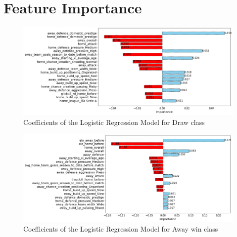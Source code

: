 \chapter{Feature Importance}
\label{appendix:feature_importance}

\begin{figure}[H]
    \centering
    \includegraphics[width=\textwidth, keepaspectratio]{images/top20_coeff_importance_lr_selected_features_draw.png}
    \caption{Coefficients of the Logistic Regression Model for Draw class}
    \label{fig:feature_coefficients}
\end{figure}

\begin{figure}[H]
    \centering
    \includegraphics[width=\textwidth, keepaspectratio]{images/top20_coeff_importance_lr_selected_features_away.png}
    \caption{Coefficients of the Logistic Regression Model for Away win class}
    \label{fig:feature_coefficients}
\end{figure}
